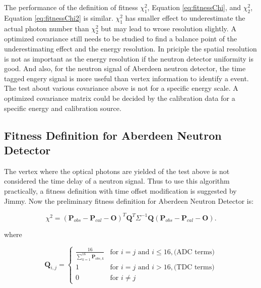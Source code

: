 The performance of the definition of fitness $\chi^2_1$, Equation \ref{eq:fitnessChi}, and $\chi^2_2$, Equation \ref{eq:fitnessChi2} is similar.
$\chi^2_1$ has smaller effect to underestimate the actual photon number than $\chi^2_2$ but may lead to wrose resolution slightly.
A optimized covariance still needs to be studied to find a balance point of the underestimating effect and the energy resolution.
In priciple the spatial resolution is not as important as the energy resolution if the neutron detector uniformity is good.
And also, for the neutron signal of Aberdeen neutron detector, the time tagged engery signal is more useful than vertex information to identify
a event.
The test about various covariance above is not for a specific energy scale.
A optimized covariance matrix could be decided by the calibration data for a specific energy and calibration source.


\subsection {Fitness Definition for Aberdeen Neutron Detector}

The vertex where the optical photons are yielded of the test above is not considered the time delay of a neutron signal.
Thus to use this algorithm practically, a fitness definition with time offset modification is suggested by Jimmy.
Now the preliminary fitness definition for Aberdeen Neutron Detector is:


\begin{equation}
\label{eq:fitnessChiTimeOffset}
\chi^{2} = (\mathbf{P}_{obs} - \mathbf{P}_{cal} - \mathbf{O})^T\mathbf{Q}^T\Sigma^{-1}\mathbf{Q}(\mathbf{P}_{obs} - \mathbf{P}_{cal} - \mathbf{O}).
\end{equation}

where

\begin{equation}
\label{eq:fitnessQTimeOffset}
\mathbf{Q}_{i,j}
= \left\{
    \begin{array}{lll}
        \frac{16} {  {\sum^{16}_{k=1}}  {\mathbf{P}_{obs,k}}  } & \mbox{for } i=j \mbox{ and } i\leq16, \mbox{(ADC terms)} \\
        1 & \mbox{for } i=j \mbox{ and } i>16, \mbox{(TDC terms)} \\
        0 & \mbox{for } i{\neq}j
    \end{array} \right.
\end{equation}




